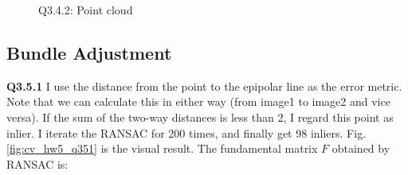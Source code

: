 \documentclass[
  course = {{16-720B Computer Vision}},
  quartile = {{1}},
  assignment = 5\ -\ 3D\ Reconstruction\ \&\ Photometric\ Stereo,
  name = {{Kangle Deng}},
  email = {{kangled@andrew.cmu.edu}},
  firstexercise = 1
]{aga-homework}
\begin{document}
\begin{figure}
    \centering
    \caption{Q3.4.2: Point cloud}
    \label{fig:cv_hw5_q342}
\end{figure}

\subsection{Bundle Adjustment}
\noindent\textbf{Q3.5.1} I use the distance from the point to the epipolar line as the error metric. Note that we can calculate this in either way (from image1 to image2 and vice versa). If the sum of the two-way distances is less than 2, I regard this point as inlier. I iterate the RANSAC for 200 times, and finally get 98 inliers. Fig.\ref{fig:cv_hw5_q351} is the visual result. The fundamental matrix $F$ obtained by RANSAC is:
\end{document}
